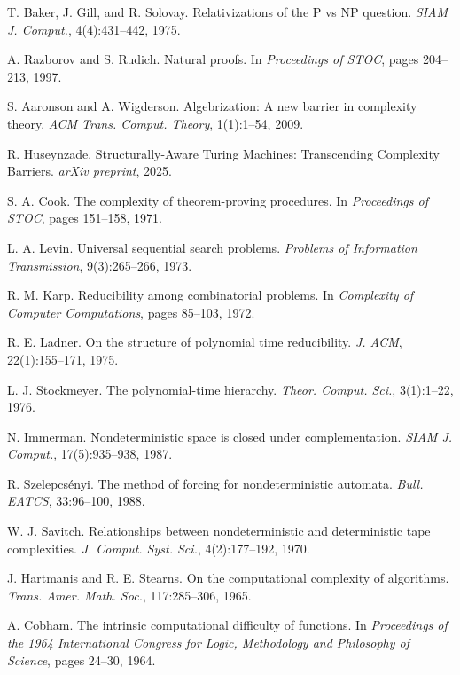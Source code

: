 \documentclass[11pt]{article}
\begin{document}
\begin{thebibliography}{99}
 T. Baker, J. Gill, and R. Solovay. Relativizations of the P vs NP question. \emph{SIAM J. Comput.}, 4(4):431--442, 1975.

 A. Razborov and S. Rudich. Natural proofs. In \emph{Proceedings of STOC}, pages 204--213, 1997.

 S. Aaronson and A. Wigderson. Algebrization: A new barrier in complexity theory. \emph{ACM Trans. Comput. Theory}, 1(1):1--54, 2009.

 R. Huseynzade. Structurally-Aware Turing Machines: Transcending Complexity Barriers. \emph{arXiv preprint}, 2025.

 S. A. Cook. The complexity of theorem-proving procedures. In \emph{Proceedings of STOC}, pages 151--158, 1971.

 L. A. Levin. Universal sequential search problems. \emph{Problems of Information Transmission}, 9(3):265--266, 1973.

 R. M. Karp. Reducibility among combinatorial problems. In \emph{Complexity of Computer Computations}, pages 85--103, 1972.

 R. E. Ladner. On the structure of polynomial time reducibility. \emph{J. ACM}, 22(1):155--171, 1975.

 L. J. Stockmeyer. The polynomial-time hierarchy. \emph{Theor. Comput. Sci.}, 3(1):1--22, 1976.

 N. Immerman. Nondeterministic space is closed under complementation. \emph{SIAM J. Comput.}, 17(5):935--938, 1987.

 R. Szelepcsényi. The method of forcing for nondeterministic automata. \emph{Bull. EATCS}, 33:96--100, 1988.

 W. J. Savitch. Relationships between nondeterministic and deterministic tape complexities. \emph{J. Comput. Syst. Sci.}, 4(2):177--192, 1970.

 J. Hartmanis and R. E. Stearns. On the computational complexity of algorithms. \emph{Trans. Amer. Math. Soc.}, 117:285--306, 1965.

 A. Cobham. The intrinsic computational difficulty of functions. In \emph{Proceedings of the 1964 International Congress for Logic, Methodology and Philosophy of Science}, pages 24--30, 1964.


\end{thebibliography}
\end{document}
